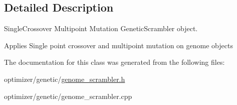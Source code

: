 \subsection{Detailed Description}
Single\+Crossover Multipoint Mutation Genetic\+Scrambler object. 

Applies Single point crossover and multipoint mutation on genome objects 

The documentation for this class was generated from the following files\+:\begin{DoxyCompactItemize}
\item 
optimizer/genetic/\hyperlink{genome__scrambler_8h}{genome\+\_\+scrambler.\+h}\item 
optimizer/genetic/genome\+\_\+scrambler.\+cpp\end{DoxyCompactItemize}
